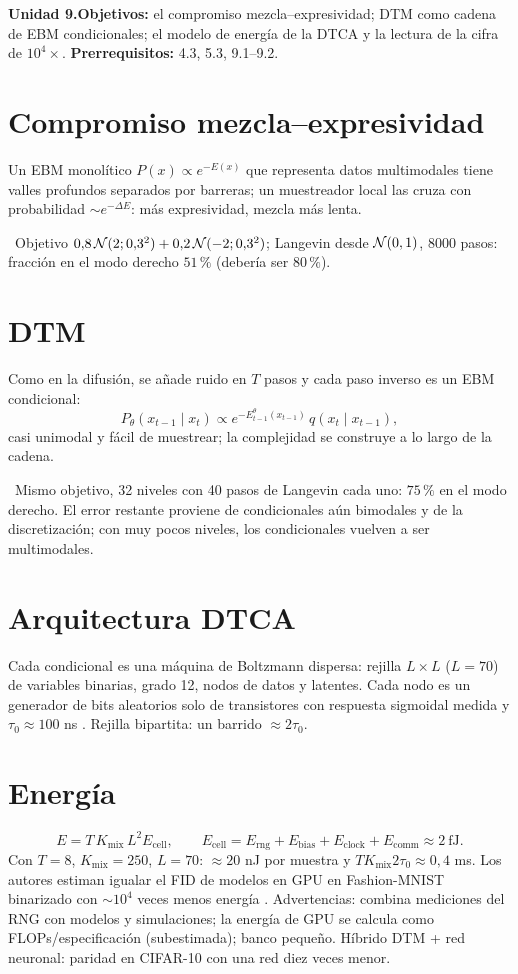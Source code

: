 \documentclass[11pt,a4paper]{article}
\begin{document}

\noindent\textbf{Unidad 9.}\quad\textbf{Objetivos:} el compromiso mezcla--expresividad; DTM como cadena de EBM condicionales; el modelo de energía de la DTCA y la lectura
de la cifra de $10^4\times$.
\textbf{Prerrequisitos:} 4.3, 5.3, 9.1--9.2.

\section{Compromiso mezcla--expresividad}
Un EBM monolítico $P(x)\propto e^{-E(x)}$ que representa datos multimodales tiene valles profundos separados por barreras; un muestreador local las cruza con probabilidad
$\sim e^{-\Delta E}$: más expresividad, mezcla más lenta.
\begin{ejemplo}
\evS\ Objetivo $0{,}8\,\mathcal{N}(2;0{,}3^2)+0{,}2\,\mathcal{N}(-2;0{,}3^2)$; Langevin desde $\mathcal{N}(0,1)$, 8000 pasos: fracción en el modo derecho $51\,\%$ (debería ser $80\,\%$).
\end{ejemplo}

\section{DTM}
Como en la difusión, se añade ruido en $T$ pasos y cada paso inverso es un EBM condicional:
\[P_\theta(x_{t-1}\mid x_t)\propto e^{-E^\theta_{t-1}(x_{t-1})}\,q(x_t\mid x_{t-1}),\]
casi unimodal y fácil de muestrear; la complejidad se construye a lo largo de la cadena.
\begin{ejemplo}
\evS\ Mismo objetivo, 32 niveles con 40 pasos de Langevin cada uno: $75\,\%$ en el modo derecho. El error restante proviene de condicionales aún bimodales y de la discretización;
con muy pocos niveles, los condicionales vuelven a ser multimodales.
\end{ejemplo}

\section{Arquitectura DTCA}
Cada condicional es una máquina de Boltzmann dispersa: rejilla $L\times L$ ($L=70$) de variables binarias, grado 12, nodos de datos y latentes. Cada nodo es un generador de bits
aleatorios solo de transistores con respuesta sigmoidal medida y $\tau_0\approx100$ ns \evM. Rejilla bipartita: un barrido $\approx2\tau_0$.

\section{Energía}
\[E=T\,K_{\text{mix}}\,L^2E_{\text{cell}},\qquad E_{\text{cell}}=E_{\text{rng}}+E_{\text{bias}}+E_{\text{clock}}+E_{\text{comm}}\approx2\ \text{fJ}.\]
Con $T=8$, $K_{\text{mix}}=250$, $L=70$: $\approx20$ nJ por muestra y $T K_{\text{mix}}2\tau_0\approx0{,}4$ ms. Los autores estiman igualar el FID de modelos en GPU en Fashion-MNIST
binarizado con $\sim10^4$ veces menos energía \evE. Advertencias: combina mediciones del RNG con modelos y simulaciones; la energía de GPU se calcula como FLOPs/especificación
(subestimada); banco pequeño. Híbrido DTM + red neuronal: paridad en CIFAR-10 con una red diez veces menor.
\end{document}
